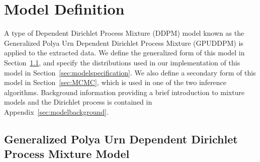 \documentclass[twocolumn, final]{svjour3}
\begin{document}




\section{Model Definition}
\label{sec:modeldefinition}

A type of Dependent Dirichlet Process Mixture (DDPM) model known as the Generalized Polya Urn Dependent Dirichlet Process Mixture (GPUDDPM) is applied to the extracted data. We define the generalized form of this model in Section~\ref{sec:gpuddpm}, and specify the distributions used in our implementation of this model in Section~\ref{sec:modelspecification}. We also define a secondary form of this model in Section~\ref{sec:MCMC}, which is used in one of the two inference algorithms. Background information providing a brief introduction to mixture models and the Dirichlet process is contained in Appendix~\ref{sec:modelbackground}.



\subsection{Generalized Polya Urn Dependent Dirichlet Process Mixture Model}
\label{sec:gpuddpm}
\end{document}
